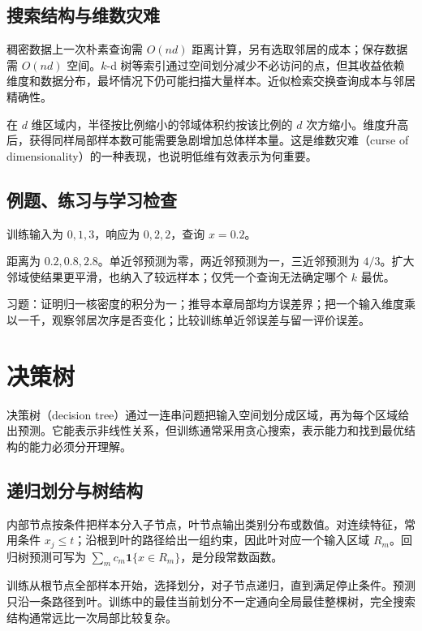 \documentclass[UTF8,12pt,a4paper,fontset=fandol]{ctexbook}
\begin{document}
\section{搜索结构与维数灾难}

稠密数据上一次朴素查询需 $O(nd)$ 距离计算，另有选取邻居的成本；保存数据需 $O(nd)$ 空间。$k$-d 树等索引通过空间划分减少不必访问的点，但其收益依赖维度和数据分布，最坏情况下仍可能扫描大量样本。近似检索交换查询成本与邻居精确性。

在 $d$ 维区域内，半径按比例缩小的邻域体积约按该比例的 $d$ 次方缩小。维度升高后，获得同样局部样本数可能需要急剧增加总体样本量。这是维数灾难（curse of dimensionality）的一种表现，也说明低维有效表示为何重要。

\section{例题、练习与学习检查}

\begin{example}[邻居数量的影响]
训练输入为 $0,1,3$，响应为 $0,2,2$，查询 $x=0.2$。
\end{example}
\begin{solve}
距离为 $0.2,0.8,2.8$。单近邻预测为零，两近邻预测为一，三近邻预测为 $4/3$。扩大邻域使结果更平滑，也纳入了较远样本；仅凭一个查询无法确定哪个 $k$ 最优。
\end{solve}

习题：证明归一核密度的积分为一；推导本章局部均方误差界；把一个输入维度乘以一千，观察邻居次序是否变化；比较训练单近邻误差与留一评价误差。

\chapter{决策树}
\label{chap:ml-trees}

决策树（decision tree）通过一连串问题把输入空间划分成区域，再为每个区域给出预测。它能表示非线性关系，但训练通常采用贪心搜索，表示能力和找到最优结构的能力必须分开理解。

\section{递归划分与树结构}

内部节点按条件把样本分入子节点，叶节点输出类别分布或数值。对连续特征，常用条件 $x_j\leq t$；沿根到叶的路径给出一组约束，因此叶对应一个输入区域 $R_m$。回归树预测可写为 $\sum_m c_m\mathbf1\{x\in R_m\}$，是分段常数函数。

训练从根节点全部样本开始，选择划分，对子节点递归，直到满足停止条件。预测只沿一条路径到叶。训练中的最佳当前划分不一定通向全局最佳整棵树，完全搜索结构通常远比一次局部比较复杂。
\end{document}
